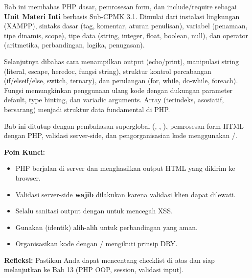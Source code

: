 \documentclass[../main.tex]{subfiles}
\begin{document}
\begin{rangkuman}
Bab ini membahas PHP dasar, pemrosesan form, dan include/require sebagai \textbf{Unit Materi Inti} berbasis Sub-CPMK 3.1. Dimulai dari instalasi lingkungan (XAMPP), sintaks dasar (tag, komentar, aturan penulisan), variabel (penamaan, tipe dinamis, scope), tipe data (string, integer, float, boolean, null), dan operator (aritmetika, perbandingan, logika, penugasan).

Selanjutnya dibahas cara menampilkan output (echo/print), manipulasi string (literal, escape, heredoc, fungsi string), struktur kontrol percabangan (if/elseif/else, switch, ternary), dan perulangan (for, while, do-while, foreach). Fungsi memungkinkan penggunaan ulang kode dengan dukungan parameter default, type hinting, dan variadic arguments. Array (terindeks, asosiatif, bersarang) menjadi struktur data fundamental di PHP.

Bab ini ditutup dengan pembahasan superglobal (, , ), pemrosesan form HTML dengan PHP, validasi server-side, dan pengorganisasian kode menggunakan /.

\textbf{Poin Kunci:}
\begin{itemize}
  \item PHP berjalan di server dan menghasilkan output HTML yang dikirim ke browser.
  \item Validasi server-side \textbf{wajib} dilakukan karena validasi klien dapat dilewati.
  \item Selalu sanitasi output dengan  untuk mencegah XSS.
  \item Gunakan \code{===} (identik) alih-alih \code{==} untuk perbandingan yang aman.
  \item Organisasikan kode dengan / mengikuti prinsip DRY.
\end{itemize}

\textbf{Refleksi:} Pastikan Anda dapat mencentang checklist di atas dan siap melanjutkan ke Bab 13 (PHP OOP, session, validasi input).
\end{rangkuman}

\ifSubfilesClassLoaded{
  \renewcommand{\bibname}{Daftar Pustaka}
  
  
}{}
\end{document}
